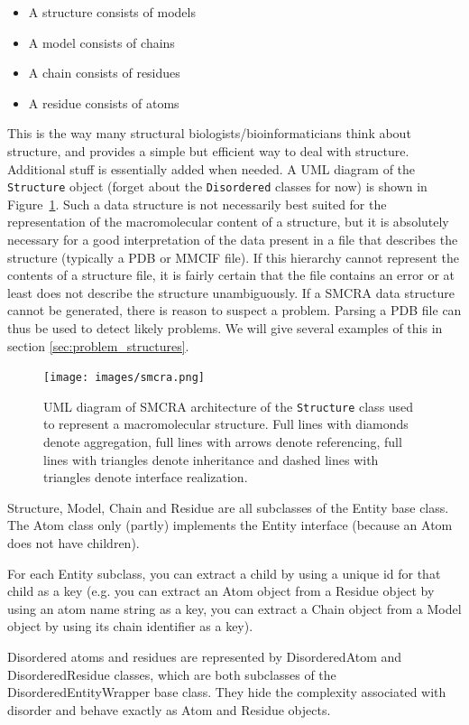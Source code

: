 \begin{itemize}
\item A structure consists of models
\item A model consists of chains
\item A chain consists of residues
\item A residue consists of atoms
\end{itemize}
This is the way many structural biologists/bioinformaticians think
about structure, and provides a simple but efficient way to deal with
structure. Additional stuff is essentially added when needed. A UML
diagram of the \texttt{Structure} object (forget about the \texttt{Disordered}
classes for now) is shown in Figure~\ref{fig:smcra}. Such a data structure is not
necessarily best suited for the representation of the macromolecular content of
a structure, but it is absolutely necessary for a good interpretation of the
data present in a file that describes the structure (typically a PDB or MMCIF
file). If this hierarchy cannot represent the contents of a structure file, it
is fairly certain that the file contains an error or at least does not describe
the structure unambiguously. If a SMCRA data structure cannot be generated,
there is reason to suspect a problem. Parsing a PDB file can thus be used to
detect likely problems. We will give several examples of this in section
\ref{sec:problem_structures}.

\begin{figure}[htbp]
\centering
\texttt{[image: images/smcra.png]}
\caption{UML diagram of SMCRA architecture of the \texttt{Structure} class used to represent a macromolecular structure.
Full lines with diamonds denote aggregation, full lines with
arrows denote referencing, full lines with triangles denote inheritance
and dashed lines with triangles denote interface realization.}
\label{fig:smcra}
\end{figure}

Structure, Model, Chain and Residue are all subclasses of the Entity base class.
The Atom class only (partly) implements the Entity interface (because an Atom
does not have children).

For each Entity subclass, you can extract a child by using a unique id for that
child as a key (e.g. you can extract an Atom object from a Residue object by
using an atom name string as a key, you can extract a Chain object from a Model
object by using its chain identifier as a key).

Disordered atoms and residues are represented by DisorderedAtom and DisorderedResidue
classes, which are both subclasses of the DisorderedEntityWrapper base class.
They hide the complexity associated with disorder and behave exactly as Atom
and Residue objects.

